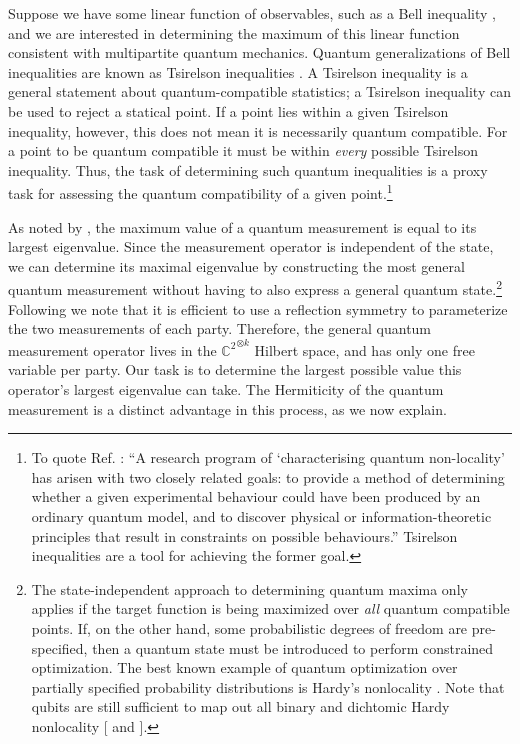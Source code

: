 \documentclass[
  12pt          %
  ,letterpaper  %
  ,center       %
  ,noupper      %
  ,english,fleqn]{uconnthesis}
\begin{document}
Suppose we have some linear function of observables, such as a Bell inequality \cite{BellOriginal,GisinFramework2012,VariousCHSHBellInequalities,BellInequalitiesReview,WringingBellInequalities}, and we are interested in determining the maximum of this linear function consistent with multipartite quantum mechanics. Quantum generalizations of Bell inequalities are known as Tsirelson inequalities \cite{Tsirelson1980,WolfeQB}. A Tsirelson inequality is a general statement about quantum-compatible statistics; a Tsirelson inequality can be used to reject a statical point. If a point lies within a given Tsirelson inequality, however, this does not mean it is necessarily quantum compatible. For a point to be quantum compatible it must be within {\em every} possible Tsirelson inequality. Thus, the task of determining such quantum inequalities is a proxy task for assessing the quantum compatibility of a given point.\footnote{To quote Ref. \cite{ConsistentHistoriesContextuality}: ``A research program of `characterising quantum non-locality' has arisen with two closely related goals: to provide a method of determining whether a given experimental behaviour could have been produced by an ordinary quantum model, and to discover physical or information-theoretic principles that result in constraints on possible behaviours.'' Tsirelson inequalities are a tool for achieving the former goal.}

As noted by \citet[Theorem 1]{Tsirelson1980}, the maximum value of a quantum measurement is equal to its largest eigenvalue. Since the measurement operator is independent of the state, we can determine its maximal eigenvalue by constructing the most general quantum measurement without having to also express a general quantum state.\footnote{The state-independent approach to determining quantum maxima only applies if the target function is being maximized over \emph{all} quantum compatible points. If, on the other hand, some probabilistic degrees of freedom are pre-specified, then a quantum state must be introduced to perform constrained optimization. The best known example of quantum optimization over partially specified probability distributions is Hardy's nonlocality \cite{Hardy92,Hardy93,Hardy97,CabelloHardy,HardyCHSH}. Note that qubits are still sufficient to map out all binary and dichtomic Hardy nonlocality [\citealp{HardyQubits06,HardyQubits11,HardyQubits12,HardyVarientDIversion} and \citealp[Sec. IV.E]{SpekkensSeer}].} Following \citet{WolfeQB} we note that it is efficient to use a reflection symmetry to parameterize the two measurements of each party. Therefore, the general quantum measurement operator lives in the ${\mathbb{C}^2}^{\otimes k}$ Hilbert space, and has only one free variable per party. Our task is to determine the largest possible value this operator's largest eigenvalue can take. The Hermiticity of the quantum measurement is a distinct advantage in this process, as we now explain.
\end{document}

